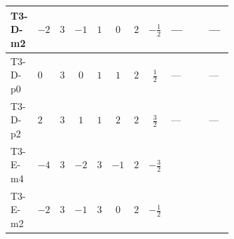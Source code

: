 \documentclass[8pt]{article}
\begin{document}
\begin{landscape}
\begin{longtable}{@{}llcccccc >{\raggedright\arraybackslash}p{0.21\linewidth} >{\raggedright\arraybackslash}p{0.21\linewidth} >{\raggedright\arraybackslash}p{0.21\linewidth}@{}}
\midrule
T3-D-m2 & $-2$ & $3$ & $-1$ & $1$ & $0$ & $2$ & $-\frac{1}{2}$ & --- & \scriptsize\adjustbox{max width=\linewidth}{$\begin{gathered} -8 \operatorname{Tr}\!\left({M_F}\,\left({y_2}\right)^{\dagger}\,{y_2}\,\left({M_F}\right)^{\dagger}\right)\end{gathered}$} & --- \\
\midrule
T3-D-p0 & $0$ & $3$ & $0$ & $1$ & $1$ & $2$ & $\frac{1}{2}$ & --- & \scriptsize\adjustbox{max width=\linewidth}{$\begin{gathered} -8 \operatorname{Tr}\!\left({M_F}\,\left({y_2}\right)^{\dagger}\,{y_2}\,\left({M_F}\right)^{\dagger}\right)\end{gathered}$} & --- \\
\midrule
T3-D-p2 & $2$ & $3$ & $1$ & $1$ & $2$ & $2$ & $\frac{3}{2}$ & --- & \scriptsize\adjustbox{max width=\linewidth}{$\begin{gathered} -8 \operatorname{Tr}\!\left({M_F}\,\left({y_2}\right)^{\dagger}\,{y_2}\,\left({M_F}\right)^{\dagger}\right)\end{gathered}$} & --- \\
\midrule
T3-E-m4 & $-4$ & $3$ & $-2$ & $3$ & $-1$ & $2$ & $-\frac{3}{2}$ & \scriptsize\adjustbox{max width=\linewidth}{$\begin{gathered} {m_2^2} (2 T_{\nu}^{(2)}+8 {\lambda_{S_2}^{(1)}}+4 {\lambda_{S_2}^{(A)}})\end{gathered}$} & \scriptsize\adjustbox{max width=\linewidth}{$\begin{gathered} -4 \operatorname{Tr}\!\left({M_F}\,\left({y_2}\right)^{\dagger}\,{y_2}\,\left({M_F}\right)^{\dagger}\right)\end{gathered}$} & \scriptsize\adjustbox{max width=\linewidth}{$\begin{gathered} -12 {g_2}^2 {m_2^2}\end{gathered}$} \\
\midrule
T3-E-m2 & $-2$ & $3$ & $-1$ & $3$ & $0$ & $2$ & $-\frac{1}{2}$ & \scriptsize\adjustbox{max width=\linewidth}{$\begin{gathered} {m_2^2} (2 T_{\nu}^{(2)}+8 {\lambda_{S_2}^{(1)}}+4 {\lambda_{S_2}^{(A)}})\end{gathered}$} & \scriptsize\adjustbox{max width=\linewidth}{$\begin{gathered} -4 \operatorname{Tr}\!\left({M_F}\,\left({y_2}\right)^{\dagger}\,{y_2}\,\left({M_F}\right)^{\dagger}\right)\end{gathered}$} & \scriptsize\adjustbox{max width=\linewidth}{$\begin{gathered} -12 {g_2}^2 {m_2^2}\end{gathered}$} \\

\end{longtable}
\end{landscape}
\end{document}
